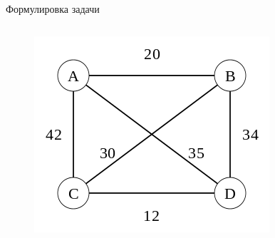 \documentclass[ignoreonframetext,unicode]{beamer}
\begin{document}
\begin{frame}{Формулировка задачи}
\begin{columns}
\begin{column}{0.4\textwidth}
		\begin{figure}[!h]
			\begin{center}
				\includegraphics[scale=0.35]{Weighted_graph}
			\end{center}
		\end{figure}
		\end{column}
	\end{columns}
\end{frame}
\end{document}
